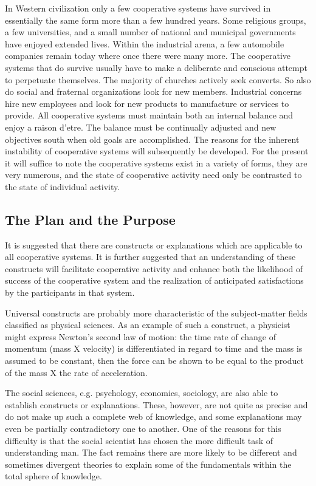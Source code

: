 In Western civilization only a few cooperative systems have survived in essentially the same form more than a few hundred years. Some religious groups, a few universities, and a small number of national and municipal governments have enjoyed extended lives. Within the industrial arena, a few automobile companies remain today where once there were many more. The cooperative systems that do survive usually have to make a deliberate and conscious attempt to perpetuate themselves. The majority of churches actively seek converts. So also do social and fraternal organizations look for new members. Industrial concerns hire new employees and look for new products to manufacture or services to provide. All cooperative systems must maintain both an internal balance and enjoy a raison d’etre. The balance must be continually adjusted and new objectives south when old goals are accomplished. The reasons for the inherent instability of cooperative systems will subsequently be developed. For the present it will suffice to note the cooperative systems exist in a variety of forms, they are very numerous, and the state of cooperative activity need only be contrasted to the state of individual activity.

\subsection{The Plan and the Purpose}

It is suggested that there are constructs or explanations which are applicable to all cooperative systems. It is further suggested that an understanding of these constructs will facilitate cooperative activity and enhance both the likelihood of success of the cooperative system and the realization of anticipated satisfactions by the participants in that system.

Universal constructs are probably more characteristic of the subject-matter fields classified as physical sciences. As an example of such a construct, a physicist might express Newton’s second law of motion: the time rate of change of momentum (mass X velocity) is differentiated in regard to time and the mass is assumed to be constant, then the force can be shown to be equal to the product of the mass X the rate of acceleration.

The social sciences, e.g. psychology, economics, sociology, are also able to establish constructs or explanations. These, however, are not quite as precise and do not make up such a complete web of knowledge, and some explanations may even be partially contradictory one to another. One of the reasons for this difficulty is that the social scientist has chosen the more difficult task of understanding man. The fact remains there are more likely to be different and sometimes divergent theories to explain some of the fundamentals within the total sphere of knowledge.


